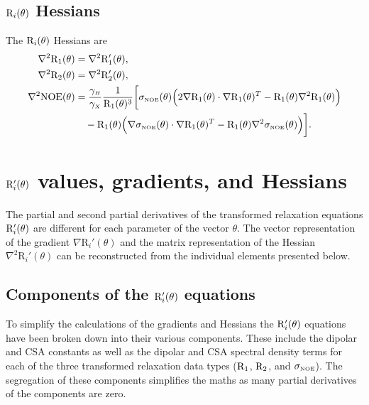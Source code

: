 \subsection{$\mathrm{R}_i(\theta)$ Hessians}

The $\mathrm{R}_i(\theta)$ Hessians are
\begin{align}
    \nabla^2 \mathrm{R}_1(\theta) & = \nabla^2 \mathrm{R}_1'(\theta), \label{eq: Ri trans: d2R1} \\
    \nabla^2 \mathrm{R}_2(\theta) & = \nabla^2 \mathrm{R}_2'(\theta), \label{eq: Ri trans: d2R2} \\
    \nabla^2 \mathrm{NOE}(\theta) & = \frac{\gamma_{\scriptscriptstyle H}}{\gamma_{\scriptscriptstyle X}} \frac{1}{\mathrm{R}_1(\theta)^3} \bigg[
        \sigma_{\scriptscriptstyle \mathrm{NOE}}(\theta) \Big( 2 \nabla \mathrm{R}_1(\theta) \cdot \nabla \mathrm{R}_1(\theta)^T - \mathrm{R}_1(\theta) \nabla^2 \mathrm{R}_1(\theta) \Big) \nonumber\\
        & \quad - \mathrm{R}_1(\theta) \Big( \nabla \sigma_{\scriptscriptstyle \mathrm{NOE}}(\theta) \cdot \nabla \mathrm{R}_1(\theta)^T - \mathrm{R}_1(\theta) \nabla^2 \sigma_{\scriptscriptstyle \mathrm{NOE}}(\theta) \Big)
    \bigg]. \label{eq: Ri trans: d2NOE}
\end{align}




\section{$\mathrm{R}_i'(\theta)$ values, gradients, and Hessians}

The partial and second partial derivatives of the transformed relaxation equations $\mathrm{R}_i'(\theta)$ are different for each parameter of the vector $\theta$.  The vector representation of the gradient $\nabla \textrm{R}_i'(\theta)$ and the matrix representation of the Hessian $\nabla^2 \textrm{R}_i'(\theta)$ can be reconstructed from the individual elements presented below.



\subsection{Components of the $\mathrm{R}_i'(\theta)$ equations}

To simplify the calculations of the gradients and Hessians the $\mathrm{R}_i'(\theta)$ equations have been broken down into their various components.  These include the dipolar and CSA constants as well as the dipolar and CSA spectral density terms for each of the three transformed relaxation data types ($\mathrm{R}_1$, $\mathrm{R}_2$, and $\sigma_{\scriptscriptstyle \mathrm{NOE}}$).  The segregation of these components simplifies the maths as many partial derivatives of the components are zero.


